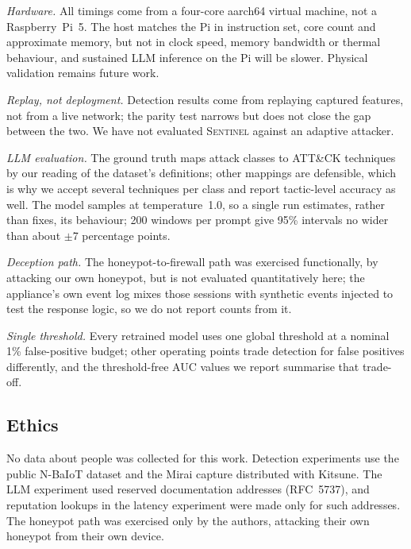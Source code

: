 \emph{Hardware.} All timings come from a four-core aarch64 virtual machine,
not a Raspberry~Pi~5. The host matches the Pi in instruction set, core count
and approximate memory, but not in clock speed, memory bandwidth or thermal
behaviour, and sustained LLM inference on the Pi will be slower. Physical
validation remains future work.

\emph{Replay, not deployment.} Detection results come from replaying captured
features, not from a live network; the parity test narrows but does not close
the gap between the two. We have not evaluated \textsc{Sentinel} against an
adaptive attacker.

\emph{LLM evaluation.} The ground truth maps attack classes to ATT\&CK
techniques by our reading of the dataset's definitions; other mappings are
defensible, which is why we accept several techniques per class and report
tactic-level accuracy as well. The model samples at temperature~1.0, so a
single run estimates, rather than fixes, its behaviour; 200 windows per prompt
give 95\% intervals no wider than about $\pm$7 percentage points.

\emph{Deception path.} The honeypot-to-firewall path was exercised
functionally, by attacking our own honeypot, but is not evaluated
quantitatively here; the appliance's own event log mixes those sessions with
synthetic events injected to test the response logic, so we do not report
counts from it.

\emph{Single threshold.} Every retrained model uses one global threshold at a
nominal 1\% false-positive budget; other operating points trade detection for
false positives differently, and the threshold-free AUC values we report
summarise that trade-off.

\subsection{Ethics}
No data about people was collected for this work. Detection experiments use
the public N-BaIoT dataset and the Mirai capture distributed with Kitsune. The
LLM experiment used reserved documentation addresses (RFC~5737), and
reputation lookups in the latency experiment were made only for such
addresses. The honeypot path was exercised only by the authors, attacking their
own honeypot from their own device.
